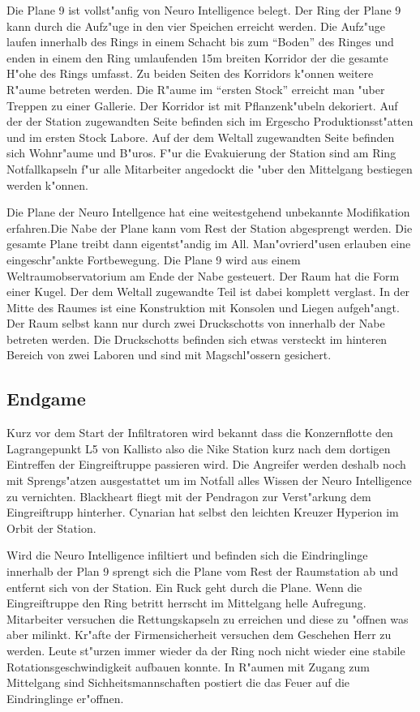 Die Plane 9 ist vollst"anfig von Neuro Intelligence belegt. Der Ring der Plane 9 kann durch die Aufz"uge in den vier Speichen erreicht werden. Die Aufz"uge laufen innerhalb des Rings in einem Schacht bis zum "`Boden"' des Ringes und enden in einem den Ring umlaufenden 15m breiten Korridor der die gesamte H"ohe des Rings umfasst. Zu beiden Seiten des Korridors k"onnen weitere R"aume betreten werden. Die R"aume im "`ersten Stock"' erreicht man "uber Treppen zu einer Gallerie. Der Korridor ist mit Pflanzenk"ubeln dekoriert. Auf der der Station zugewandten Seite befinden sich im Ergescho\3 Produktionsst"atten und im ersten Stock Labore. Auf der dem Weltall zugewandten Seite befinden sich Wohnr"aume und B"uros. F"ur die Evakuierung der Station sind am Ring Notfallkapseln f"ur alle Mitarbeiter angedockt die "uber den Mittelgang bestiegen werden k"onnen.

Die Plane der Neuro Intellgence hat eine weitestgehend unbekannte Modifikation erfahren.Die Nabe der Plane kann vom Rest der Station abgesprengt werden. Die gesamte Plane treibt dann eigentst"andig im All. Man"ovrierd"usen erlauben eine eingeschr"ankte Fortbewegung. Die Plane 9 wird aus einem Weltraumobservatorium am Ende der Nabe gesteuert. Der Raum hat die Form einer Kugel. Der dem Weltall zugewandte Teil ist dabei komplett verglast. In der Mitte des Raumes ist eine Konstruktion mit Konsolen und Liegen aufgeh"angt. Der Raum selbst kann nur durch zwei Druckschotts von innerhalb der Nabe betreten werden. Die Druckschotts befinden sich etwas versteckt im hinteren Bereich von zwei Laboren und sind mit Magschl"ossern gesichert.

\subsection{Endgame}

Kurz vor dem Start der Infiltratoren wird bekannt dass die Konzernflotte den Lagrangepunkt L5 von Kallisto also die Nike Station kurz nach dem dortigen Eintreffen der Eingreiftruppe passieren wird. Die Angreifer werden deshalb noch mit Sprengs"atzen ausgestattet um im Notfall alles Wissen der Neuro Intelligence zu vernichten. Blackheart fliegt mit der Pendragon zur Verst"arkung dem Eingreiftrupp hinterher. Cynarian hat selbst den leichten Kreuzer Hyperion im Orbit der Station.

Wird die Neuro Intelligence infiltiert und befinden sich die Eindringlinge innerhalb der Plan 9 sprengt sich die Plane vom Rest der Raumstation ab und entfernt sich von der Station. Ein Ruck geht durch die Plane. Wenn die Eingreiftruppe den Ring betritt herrscht im Mittelgang helle Aufregung. Mitarbeiter versuchen die Rettungskapseln zu erreichen und diese zu "offnen was aber mi\3linkt. Kr"afte der Firmensicherheit versuchen dem Geschehen Herr zu werden. Leute st"urzen immer wieder da der Ring noch nicht wieder eine stabile Rotationsgeschwindigkeit aufbauen konnte. In R"aumen mit Zugang zum Mittelgang sind Sichheitsmannschaften postiert die das Feuer auf die Eindringlinge er"offnen.

